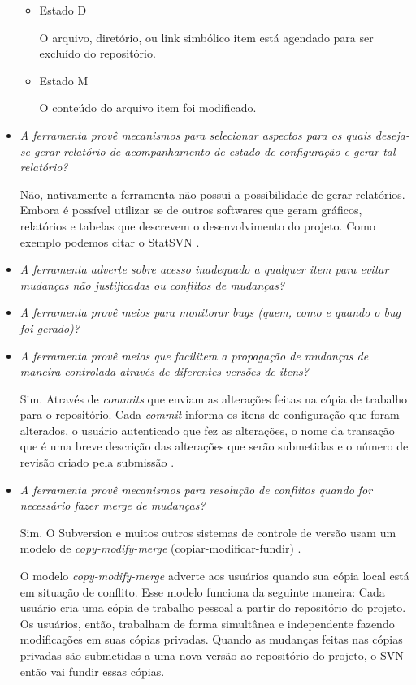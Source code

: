 \begin{itemize}
\begin{itemize}
          \item Estado D

          O arquivo, diretório, ou link simbólico item está agendado para ser excluído do repositório.

          \item Estado M

          O conteúdo do arquivo item foi modificado.
        \end{itemize}

  \item \textit{A ferramenta provê mecanismos para selecionar aspectos para os quais deseja-se gerar relatório
  de acompanhamento de estado de configuração e gerar tal relatório?}

      Não, nativamente a ferramenta não possui a possibilidade de gerar relatórios. Embora é possível utilizar se de outros softwares que geram gráficos, relatórios e tabelas que descrevem o desenvolvimento do projeto. Como exemplo podemos citar o StatSVN \footnotemark. 

  \item \textit{A ferramenta adverte sobre acesso inadequado a qualquer item para evitar mudanças não justificadas
  ou conflitos de mudanças?}
  \item \textit{A ferramenta provê meios para monitorar bugs (quem, como e quando o bug foi gerado)?}
  
  \item \textit{A ferramenta provê meios que facilitem a propagação de mudanças de maneira controlada
  através de diferentes versões de itens?}
  
  Sim. Através de \textit{commits} que enviam as alterações feitas na cópia de trabalho para o repositório. Cada \textit{commit} 
  informa os itens de configuração que foram alterados, o usuário autenticado que fez as alterações, o nome da transação que é uma breve descrição
  das alterações que serão submetidas e o número de revisão criado pela submissão \cite{svn-book}.
  
  \item \textit{A ferramenta provê mecanismos para resolução de conflitos quando for necessário fazer merge
  de mudanças?}
  
  Sim. O Subversion e muitos outros sistemas de controle de versão usam um modelo de \textit{copy-modify-merge} (copiar-modificar-fundir) \cite{svn-book}. 
  
  O modelo \textit{copy-modify-merge} adverte aos usuários quando sua cópia local está em situação de conflito.
  Esse modelo funciona da seguinte maneira: 
  Cada usuário cria uma cópia de trabalho pessoal a partir do repositório do projeto. Os usuários, então, 
  trabalham de forma simultânea e independente fazendo modificações em suas cópias privadas. Quando as mudanças 
  feitas nas cópias privadas são submetidas a uma nova versão ao repositório do projeto, o SVN então vai fundir essas cópias.
  

\end{itemize}
